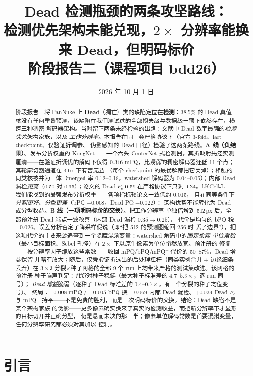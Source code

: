 \documentclass[11pt]{article}
\title{\bfseries Dead 检测瓶颈的两条攻坚路线：\\
检测优先架构未能兑现，$2\times$ 分辨率能换来 Dead，但明码标价\\[6pt]
\large 阶段报告二（课程项目 bdd26）}
\author{}
\date{2026 年 10 月 1 日}
\begin{document}
\maketitle


\begin{abstract}
阶段报告一将 PanNuke 上 \textbf{Dead}（凋亡）类的缺陷定位在\textbf{检测}：38.5\% 的 Dead
真值核没有任何重叠预测，该缺陷在我们测试过的全部损失级与数据级干预下依然存在，横跨三种稠密
解码器架构。当时留下两条未经检验的出路：文献中 Dead 数字最强的\emph{检测优先}架构家族，以及
\emph{工作分辨率}。本报告在同一套严格协议下（官方 3-fold、last checkpoint、仅验证折调参、
伪影感知的 Dead 口径）检验了这两条路线。\textbf{A 线（负结果）}。发布分折权重的
KongNet——一个六头 CenterNet 式检测器，其折映射先经实测厘清——在验证折调优的解码下仅得
0.346 mPQ，比\emph{最弱}的稠密解码器还低 11 个点；其轮廓切割通道在 40$\times$ 下有害无益
（每个 checkpoint 的最优解都把它关掉）；相触的同类核被并为一体（merged 率 0.12--0.18，watershed
解码器为 0.04--0.05）；内部 Dead 漏检\emph{更高}（0.50 对 0.35）；论文的 Dead $F_c$ 0.59
在严格协议下只剩 0.34。LKCell-L——我们能找到的最强发布分折权重——各项指标较论文一致低约 0.015，
且在同等条件下\emph{分割更好、分型更差}（bPQ $+0.008$，Dead PQ $-0.022$）：
架构优势不能转化为 Dead 或分型收益。\textbf{B 线（一项明码标价的交换）}。把工作分辨率
单独倍增到 512\,px 后，全部预注册 Dead 端点一致改善（内部 Dead 漏检 $0.35\!\to\!0.25$），
代价是均匀的 bPQ 税 $-0.026$。误差分析否定了降采样假说（即“把 512 的预测图缩回 256 时
丢了边界”），把这项代价的主要来源追查到一个隐藏混淆变量：watershed 解码中的\emph{固定像素
单位常数}（最小目标面积、Sobel 孔径）在 $2\times$ 下以原生像素为单位悄然放宽。预注册的
修复——按分辨率因子缩放这些常数——收回 mPQ/bPQ/mPQ$^+$ 代价的 50--87\%，Dead 增益保留
并略有放大；随后，仅凭验证折选出的后处理杠杆（同类实例合并 $+$ 边缘细条丢弃）在
$3{\times}3$ 分裂$\times$种子网格的全部 9 个 run 上均带来严格的测试集改进。该网格的预注册
种子噪声判定：\emph{代价}对种子稳健（最大种子标准差的 $4.7$--$5.3\times$，逐 run 同号）；
\emph{Dead 增益}脆弱（逐种子 Dead 标准差的 $0.4$--$0.7\times$，有一个分裂的种子均值变号）。
终局：$-0.008$ mPQ / $-0.005$ bPQ 换 $-0.069$ 内部 Dead 漏检、$+0.034$ Dead $F_c$ 与
mPQ$^+$ 持平——不是免费的胜利，而是一次明码标价的交换。结论：Dead 缺陷不是某个架构家族
的伪影——更多像素确实换来了真实的检测收益，而把新分辨率下才显形的目标切开并正确分型，
仍是悬而未决的那一半；像素单位解码常数是首要混淆变量，任何分辨率研究都必须对其加以
控制。
\end{abstract}

\section{引言}
\label{sec:intro}
\end{document}
